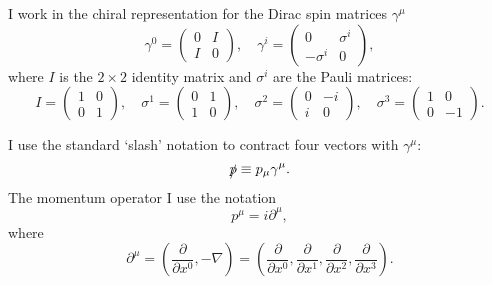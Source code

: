 I work in the chiral representation for the Dirac spin matrices $\gamma^\mu$
\begin{equation}
  \gamma^0=\left(\begin{matrix}0 & I \\ I & 0\end{matrix}\right),\quad\gamma^i=\left(\begin{matrix}0 & \sigma^i \\ -\sigma^i & 0 \end{matrix}\right),
\end{equation}
where $I$ is the $2\times 2$ identity matrix and $\sigma^i$ are the Pauli matrices:
\begin{equation}
  I=\left(\begin{matrix}1 & 0 \\ 0 & 1\end{matrix}\right),\quad\sigma^1=\left(\begin{matrix}0 & 1 \\ 1 & 0\end{matrix}\right),\quad\sigma^2=\left(\begin{matrix}0 & -i \\ i & 0\end{matrix}\right),\quad\sigma^3=\left(\begin{matrix}1 & 0 \\ 0 & -1\end{matrix}\right).
\end{equation}

I use the standard `slash' notation to contract four vectors with $\gamma^\mu$:
\begin{equation}
  \slashed{p} \equiv p_\mu\gamma^\mu.
\end{equation}
The momentum operator I use the notation
\begin{equation}
  p^\mu = i\partial^\mu,
\end{equation}
where
\begin{equation}
 \partial^\mu = \left(\frac{\partial}{\partial x^0}, -\nabla\right)=\left(\frac{\partial}{\partial x^0},\frac{\partial}{\partial x^1},\frac{\partial}{\partial x^2},\frac{\partial}{\partial x^3}\right).
\end{equation}

